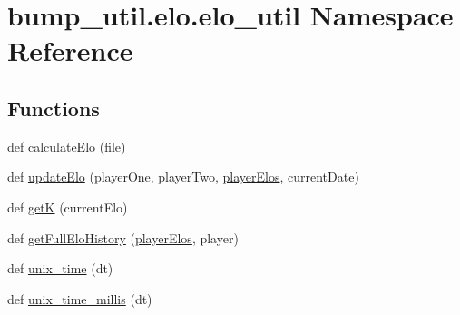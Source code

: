 \hypertarget{namespacebump__util_1_1elo_1_1elo__util}{}\section{bump\+\_\+util.\+elo.\+elo\+\_\+util Namespace Reference}
\label{namespacebump__util_1_1elo_1_1elo__util}
\subsection*{Functions}
\begin{DoxyCompactItemize}
\item 
def \hyperlink{namespacebump__util_1_1elo_1_1elo__util_a6f5e864e37ad79f2dfb4910f59188102}{calculate\+Elo} (file)
\item 
def \hyperlink{namespacebump__util_1_1elo_1_1elo__util_ac44eb649027f2ed4fa495515f97b3a23}{update\+Elo} (player\+One, player\+Two, \hyperlink{namespacebump__util_1_1elo_1_1elo__util_ad86bc16b39f702552f41a83c392584ab}{player\+Elos}, current\+Date)
\item 
def \hyperlink{namespacebump__util_1_1elo_1_1elo__util_a44018b0cdcec41d0c9109f7d779499f6}{get\+K} (current\+Elo)
\item 
def \hyperlink{namespacebump__util_1_1elo_1_1elo__util_a07ac56703ceb5594ff35397f7563dcc0}{get\+Full\+Elo\+History} (\hyperlink{namespacebump__util_1_1elo_1_1elo__util_ad86bc16b39f702552f41a83c392584ab}{player\+Elos}, player)
\item 
def \hyperlink{namespacebump__util_1_1elo_1_1elo__util_a8be8ac03c6f890c84ae28773f8f26ace}{unix\+\_\+time} (dt)
\item 
def \hyperlink{namespacebump__util_1_1elo_1_1elo__util_a38113faef2d41311faad067c9fcfa48e}{unix\+\_\+time\+\_\+millis} (dt)
\end{DoxyCompactItemize}
